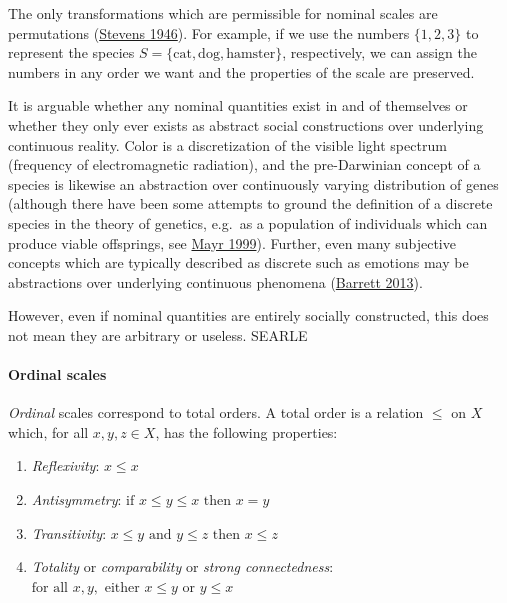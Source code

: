 \documentclass[
]{book}
\providecommand{\tightlist}{%
  \setlength{\itemsep}{0pt}\setlength{\parskip}{0pt}}
\theoremstyle{definition}
\theoremstyle{definition}
\theoremstyle{definition}
\theoremstyle{definition}
\theoremstyle{remark}
\begin{document}
The only transformations which are permissible for nominal scales are permutations (\protect\hyperlink{ref-stevens1946}{Stevens 1946}). For example, if we use the numbers \(\{ 1, 2, 3 \}\) to represent the species \(S = \{ \text{cat}, \text{dog}, \text{hamster} \}\), respectively, we can assign the numbers in any order we want and the properties of the scale are preserved.

It is arguable whether any nominal quantities exist in and of themselves or whether they only ever exists as abstract social constructions over underlying continuous reality. Color is a discretization of the visible light spectrum (frequency of electromagnetic radiation), and the pre-Darwinian concept of a species is likewise an abstraction over continuously varying distribution of genes (although there have been some attempts to ground the definition of a discrete species in the theory of genetics, e.g.~as a population of individuals which can produce viable offsprings, see \protect\hyperlink{ref-mayr1999}{Mayr 1999}). Further, even many subjective concepts which are typically described as discrete such as emotions may be abstractions over underlying continuous phenomena (\protect\hyperlink{ref-barrett2013}{Barrett 2013}).

However, even if nominal quantities are entirely socially constructed, this does not mean they are arbitrary or useless. SEARLE

\hypertarget{ordinal-scales}{%
\paragraph{Ordinal scales}\label{ordinal-scales}}

\emph{Ordinal} scales correspond to total orders. A total order is a relation \(\leq\) on \(X\) which, for all \(x, y, z \in X\), has the following properties:

\begin{enumerate}
\def\labelenumi{\arabic{enumi})}
\tightlist
\item
  \emph{Reflexivity}: \(x \leq x\)
\item
  \emph{Antisymmetry}: \(\text{if } x \leq y \leq x \text{ then } x = y\)
\item
  \emph{Transitivity}: \(x \leq y \text{ and } y \leq z \text{ then } x \leq z\)
\item
  \emph{Totality} or \emph{comparability} or \emph{strong connectedness}: \(\text{for all } x, y, \text{ either } x \leq y \text{ or } y \leq x\)
\end{enumerate}
\end{document}
